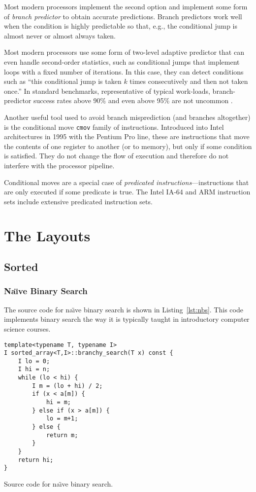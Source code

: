 \documentclass{patmorin}
\newcommand{\lstlabel}[1]{\label{lst:#1}}
\newcommand{\lstref}[1]{Listing~\ref{lst:#1}}
\begin{document}
Most modern processors implement the second option and implement
some form of \emph{branch predictor} to obtain accurate predictions.
Branch predictors work well when the condition is highly predictable so
that, e.g., the conditional jump is almost never or almost always taken.

Most modern processors use some form of two-level adaptive predictor
\cite{yeh.patt.two-level} that can even handle second-order statistics,
such as conditional jumps that implement loops with a fixed number of
iterations. In this case, they can detect conditions such as ``this
conditional jump is taken $k$ times consecutively and then not taken
once.''  In standard benchmarks, representative of typical work-loads,
branch-predictor success rates above 90\% and even above 95\% are not
uncommon \cite{X}.

Another useful tool used to avoid branch misprediction (and branches
altogether) is the conditional move \texttt{cmov} family
of instructions.  Introduced into Intel architectures in 1995 with
the Pentium Pro line, these are instructions that move the contents of
one register to another (or to memory), but only if some condition is
satisfied. They do not change the flow of execution and therefore do
not interfere with the processor pipeline.

Conditional moves are a special case of \emph{predicated
instructions}---instructions that are only executed if some predicate
is true.  The Intel IA-64 and ARM instruction sets include extensive
predicated instruction sets.

\section{The Layouts}

\subsection{Sorted}

\subsubsection{Na\"{\i}ve Binary Search}

The source code for na\"{\i}ve binary search is shown in
\lstref{nbs}. This code implements binary search the way it is typically
taught in introductory computer science courses.

\begin{listing}
\begin{verbatim}
template<typename T, typename I>
I sorted_array<T,I>::branchy_search(T x) const {
    I lo = 0;
    I hi = n;
    while (lo < hi) {
        I m = (lo + hi) / 2;
        if (x < a[m]) {
            hi = m;
        } else if (x > a[m]) {
            lo = m+1;
        } else {
            return m;
        }
    }
    return hi;
}
\end{verbatim}
\caption{Source code for na\"{\i}ve binary search.}
\lstlabel{nbs}
\end{listing}
\end{document}

